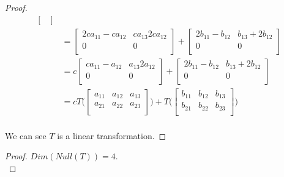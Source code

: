 \documentclass[12pt]{article}
\newenvironment{exercise}[2][Exercise]{\begin{trivlist}
\item[\hskip \labelsep{\bfseries #1}\hskip \labelsep{\bfseries #2.}]}{\end{trivlist}}
\begin{document}
\begin{exercise}{2.1.4}
\begin{proof}
\begin{align*}
\begin{bmatrix}
                \end{bmatrix} \\
            & = \begin{bmatrix}
                    2ca_{11} - ca_{12} & ca_{13} 2ca_{12} \\
                    0 & 0 \\
                \end{bmatrix} +
                \begin{bmatrix}
                    2b_{11} - b_{12} & b_{13} + 2b_{12} \\
                    0 & 0 \\
                \end{bmatrix} \\
            & = c\begin{bmatrix}
                    ca_{11} - a_{12} & a_{13} 2a_{12} \\
                    0 & 0 \\
                \end{bmatrix} +
                \begin{bmatrix}
                    2b_{11} - b_{12} & b_{13} + 2b_{12} \\
                    0 & 0 \\
                \end{bmatrix} \\
            & = cT\big(\begin{bmatrix}
                    a_{11} & a_{12} & a_{13} \\
                    a_{21} & a_{22} & a_{23} \\
                \end{bmatrix}\big) + 
                T\big(\begin{bmatrix}
                    b_{11} & b_{12} & b_{13} \\
                    b_{21} & b_{22} & b_{23} \\
                \end{bmatrix}\big) \\
        \end{align*}

        \noindent We can see $T$ is a linear transformation.

    \end{proof}

    \begin{proof} $Dim(Null(T)) = 4$. \\


\end{proof}
\end{exercise}
\end{document}
